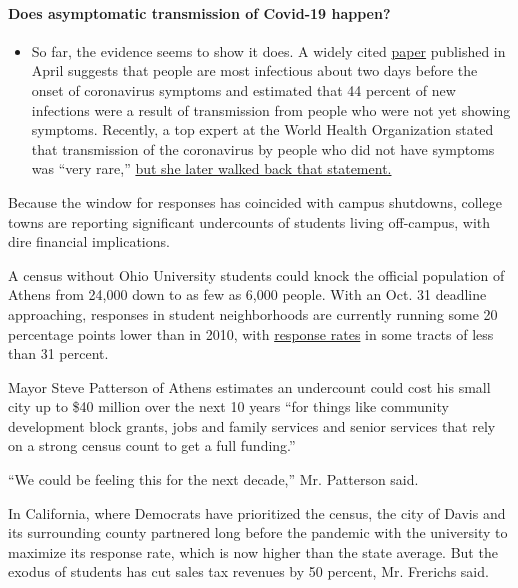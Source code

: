 \begin{itemize}
{  \paragraph{Does asymptomatic transmission of Covid-19
  happen?}\label{does-asymptomatic-transmission-of-covid-19-happen}}

  \begin{itemize}
  \tightlist
  \item
    So far, the evidence seems to show it does. A widely cited
    \href{https://www.nature.com/articles/s41591-020-0869-5}{paper}
    published in April suggests that people are most infectious about
    two days before the onset of coronavirus symptoms and estimated that
    44 percent of new infections were a result of transmission from
    people who were not yet showing symptoms. Recently, a top expert at
    the World Health Organization stated that transmission of the
    coronavirus by people who did not have symptoms was ``very rare,''
    \href{https://www.nytimes.com/2020/06/09/world/coronavirus-updates.html?action=click\&pgtype=Article\&state=default\&region=MAIN_CONTENT_3\&context=storylines_faq\#link-1f302e21}{but
    she later walked back that statement.}
  \end{itemize}
\end{itemize}

Because the window for responses has coincided with campus shutdowns,
college towns are reporting significant undercounts of students living
off-campus, with dire financial implications.

A census without Ohio University students could knock the official
population of Athens from 24,000 down to as few as 6,000 people. With an
Oct. 31 deadline approaching, responses in student neighborhoods are
currently running some 20 percentage points lower than in 2010, with
\href{https://2020census.gov/en/response-rates.html}{response rates} in
some tracts of less than 31 percent.

Mayor Steve Patterson of Athens estimates an undercount could cost his
small city up to \$40 million over the next 10 years ``for things like
community development block grants, jobs and family services and senior
services that rely on a strong census count to get a full funding.''

``We could be feeling this for the next decade,'' Mr. Patterson said.

In California, where Democrats have prioritized the census, the city of
Davis and its surrounding county partnered long before the pandemic with
the university to maximize its response rate, which is now higher than
the state average. But the exodus of students has cut sales tax revenues
by 50 percent, Mr. Frerichs said.

